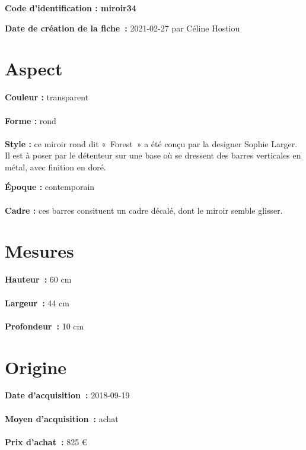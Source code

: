 
     {\bf \huge Code d’identification : miroir34} \\
    \newline \hr \begin{center} 
       
    \end{center} 
    \begin{itemize}
    
    \footnotesize {\item {\bf Date de création de la fiche :} 2021-02-27
    {par Céline Hostiou}} 
    \end{itemize}
   \hr 
    \section* {Aspect} 
    {\bf \large Couleur :} transparent
    \\ \\ {\bf \large Forme :} rond 
    \\ \\ {\bf \large Style :} 
            ce miroir rond dit « Forest » a été conçu par la designer Sophie
            Larger. Il est à poser par le détenteur sur une base où se dressent des barres
            verticales en métal, avec finition en doré.
         
        {\bf \large Époque :} contemporain 
    \\ \\ {\bf \large Cadre :} ces barres consituent un cadre décalé, dont le miroir semble glisser. 
    \section* {Mesures}
     {\bf \large Hauteur :} 60 cm
   \\ \\ {\bf \large Largeur :} 44 cm 
   \\ \\ {\bf \large Profondeur :} 10 cm  
  
    \section* {Origine}
    {\bf \large Date d’acquisition :} 2018-09-19 \\ \\
    {\bf \large Moyen d’acquisition :} achat \\ \\ {\bf \large Prix d’achat :}
        825 € 
      
